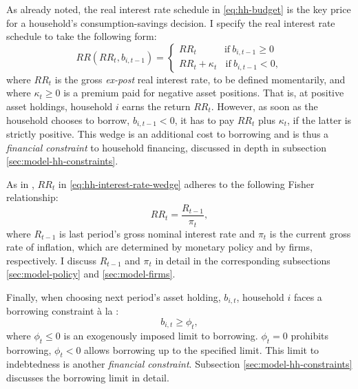 \documentclass[12pt]{article} %
\numberwithin{equation}{section} %
\numberwithin{figure}{section}
\numberwithin{table}{section}
\begin{document}
As already noted, the real interest rate schedule in \eqref{eq:hh-budget} is the key price for a household's consumption-savings decision. I specify the real interest rate schedule to take the following form:
\begin{equation}
    RR (RR_t, b_{i,t-1}) = \begin{cases}
	RR_t \ \ \ \ \ \ \ \ \ \ \ \ \ \text{if} \ b_{i,t-1} \ge 0 \\
	RR_t + \kappa_t \ \ \ \ \text{if} \ b_{i,t-1} < 0,
	\end{cases} \label{eq:hh-interest-rate-wedge}
\end{equation}
where $RR_t$ is the gross \textit{ex-post} real interest rate, to be defined momentarily, and where $\kappa_t \ge 0$ is a premium paid for negative asset positions. That is, at positive asset holdings, household $i$ earns the return $RR_t$. However, as soon as the household chooses to borrow, $b_{i,t-1} < 0$, it has to pay $RR_t$ plus $\kappa_t$, if the latter is strictly positive. This wedge is an additional cost to borrowing and is thus a \textit{financial constraint} to household financing, discussed in depth in subsection \ref{sec:model-hh-constraints}.

As in \textcite{auclert2021}, $RR_t$ in \eqref{eq:hh-interest-rate-wedge} adheres to the following Fisher relationship:
\begin{equation}
    RR_t = \frac{R_{t-1}}{\pi_t}, \label{eq:hh-fisher-equation}
\end{equation}
where $R_{t-1}$ is last period's gross nominal interest rate and $\pi_t$ is the current gross rate of inflation, which are determined by monetary policy and by firms, respectively. I discuss $R_{t-1}$ and $\pi_t$ in detail in the corresponding subsections \ref{sec:model-policy} and \ref{sec:model-firms}.

Finally, when choosing next period's asset holding, $b_{i,t}$, household $i$ faces a borrowing constraint à la \textcite{huggett1993}:
\begin{equation}
    b_{i,t} \ge \phi_t, \label{eq:borrowing-limit}
\end{equation}
where $\phi_t \le 0$ is an exogenously imposed limit to borrowing. $\phi_t = 0$ prohibits borrowing, $\phi_t < 0$ allows borrowing up to the specified limit. This limit to indebtedness is another \textit{financial constraint}. Subsection \ref{sec:model-hh-constraints} discusses the borrowing limit in detail.

\end{document}
